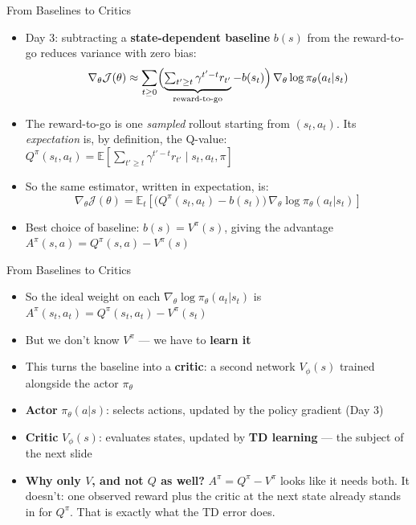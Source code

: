 \begin{frame}{From Baselines to Critics}
\begin{itemize}
    \item Day 3: subtracting a \textbf{state-dependent baseline} $b(s)$ from the reward-to-go reduces variance with zero bias:
    $$\nabla_\theta \mathcal{J}(\theta) \approx \sum_{t \geq 0} \Bigl( \underbrace{\textstyle\sum_{t' \geq t} \gamma^{t'-t} r_{t'}}_{\text{reward-to-go}} - b(s_t) \Bigr)\, \nabla_\theta \log \pi_\theta(a_t|s_t)$$
    \pause
    \item The reward-to-go is one \emph{sampled} rollout starting from $(s_t, a_t)$. Its \emph{expectation} is, by definition, the Q-value: $Q^{\pi}(s_t,a_t) = \mathbb{E}\!\left[\sum_{t' \geq t} \gamma^{t'-t} r_{t'} \mid s_t, a_t, \pi\right]$
    \item So the same estimator, written in expectation, is:
    $$\nabla_\theta \mathcal{J}(\theta) = \mathbb{E}_t\!\left[\bigl(Q^{\pi}(s_t,a_t) - b(s_t)\bigr)\, \nabla_\theta \log \pi_\theta(a_t|s_t)\right]$$
    \item Best choice of baseline: $b(s) = V^{\pi}(s)$, giving the advantage $A^{\pi}(s,a) = Q^{\pi}(s,a) - V^{\pi}(s)$
\end{itemize}
\end{frame}

\begin{frame}{From Baselines to Critics}
\begin{itemize}
    \item So the ideal weight on each $\nabla_\theta \log \pi_\theta(a_t|s_t)$ is $A^{\pi}(s_t,a_t) = Q^{\pi}(s_t,a_t) - V^{\pi}(s_t)$
    \item But we don't know $V^{\pi}$ --- we have to \textbf{learn it}
    \item This turns the baseline into a \textbf{critic}: a second network $V_\phi(s)$ trained alongside the actor $\pi_\theta$
    \vspace{0.5em}
    \item \textbf{Actor} $\pi_\theta(a|s)$: selects actions, updated by the policy gradient (Day 3)
    \item \textbf{Critic} $V_\phi(s)$: evaluates states, updated by \textbf{TD learning} --- the subject of the next slide
    \pause
    \vspace{0.5em}
    \item \textbf{Why only $V$, and not $Q$ as well?} $A^{\pi} = Q^{\pi} - V^{\pi}$ looks like it needs both. It doesn't: one observed reward plus the critic at the next state already stands in for $Q^{\pi}$. That is exactly what the TD error does.
\end{itemize}
\end{frame}
